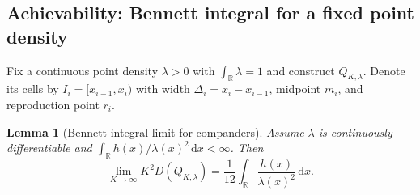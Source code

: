\documentclass{article}
\newtheorem{lemma}{Lemma}
\newcommand{\R}{\mathbb{R}}
\newcommand{\dd}{\,\mathrm{d}}
\begin{document}
\subsection{Achievability: Bennett integral for a fixed point density}\label{app:achievability_bennett}
Fix a continuous point density $\lambda>0$ with $\int_{\R}\lambda=1$ and construct $Q_{K,\lambda}$. Denote its cells by $I_i=[x_{i-1},x_i)$ with width $\Delta_i=x_i-x_{i-1}$, midpoint $m_i$, and reproduction point $r_i$.

\begin{lemma}[Bennett integral limit for companders]\label{lem:bennett_limit}
Assume $\lambda$ is continuously differentiable and $\int_\R h(x)/\lambda(x)^2\dd x<\infty$. Then
\begin{equation}\label{eq:bennett_app_new}
\lim_{K\to\infty} K^2 D(Q_{K,\lambda})
=\frac{1}{12}\int_{\R}\frac{h(x)}{\lambda(x)^2}\dd x.
\end{equation}
\end{lemma}
\end{document}
